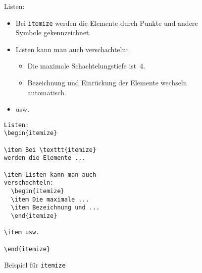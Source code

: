 \begin{figure}[!htbp]
\oben{\textwidth}
\exa
Listen:
\begin{itemize}
\item Bei \texttt{itemize} werden
die Elemente durch Punkte und andere Symbole gekennzeichnet. 
\item Listen kann man auch
verschachteln:
  \begin{itemize}
  \item Die maximale Schachtelungstiefe
  ist~4.
  \item
  Bezeichnung und Einrückung der Elemente
  wechseln automatisch.
  \end{itemize}
\item usw.
\end{itemize}
\exb
\begin{verbatim}
Listen:
\begin{itemize}
 
\item Bei \texttt{itemize}
werden die Elemente ...
 
\item Listen kann man auch
verschachteln:
  \begin{itemize}
  \item Die maximale ...
  \item Bezeichnung und ...
  \end{itemize}
 
\item usw.
 
\end{itemize}
\end{verbatim}
\exc
\unten
\caption{Beispiel für \texttt{itemize}} \label{item}
\end{figure}


